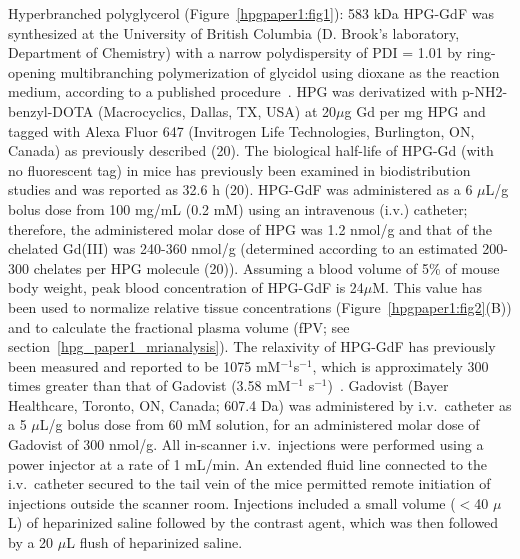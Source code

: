 Hyperbranched polyglycerol (Figure~\ref{hpgpaper1:fig1}): 583 \acs{kDa} \acs{HPG-GdF} was synthesized at the University of British Columbia (D. Brook's laboratory, Department of Chemistry) with a narrow polydispersity of PDI = 1.01 by ring-opening multibranching polymerization of glycidol using dioxane as the reaction medium, according to a published procedure~\cite{Kainthan:2006ce}.
HPG was derivatized with p-NH2-benzyl-DOTA (Macrocyclics, Dallas, TX, USA) at 20$\mu$g Gd per mg HPG and tagged with Alexa Fluor 647 (Invitrogen Life Technologies, Burlington, ON, Canada) as previously described (20).
The biological half-life of HPG-Gd (with no fluorescent tag) in mice has previously been examined in biodistribution studies and was reported as 32.6 h (20).
HPG-GdF was administered as a 6 $\mu$L/g bolus dose from 100 mg/mL (0.2 mM) using an intravenous (i.v.) catheter; therefore, the administered molar dose of HPG was 1.2 nmol/g and that of the chelated Gd(III) was 240-360 nmol/g (determined according to an estimated 200-300 chelates per HPG molecule (20)).
Assuming a blood volume of 5\% of mouse body weight, peak blood concentration of \acs{HPG-GdF} is 24$\mu$M.
This value has been used to normalize relative tissue concentrations (Figure~\ref{hpgpaper1:fig2}(B)) and to calculate the fractional plasma volume (\acs{fPV}; see section~\ref{hpg_paper1_mrianalysis}).
The relaxivity of \acs{HPG-GdF} has previously been measured and reported to be 1075 mM$^{-1}$s$^{-1}$, which is approximately 300 times greater than that of Gadovist (3.58 mM$^{-1}$ s$^{-1}$)~\cite{Saatchi:2012hc}.
Gadovist (Bayer Healthcare, Toronto, ON, Canada; 607.4 \acs{Da}) was administered by i.v.\ catheter as a 5 $\mu$L/g bolus dose from 60 mM solution, for an administered molar dose of Gadovist of 300 nmol/g.
All in-scanner i.v.\ injections were performed using a power injector at a rate of 1 mL/min.
An extended fluid line connected to the i.v.\ catheter secured to the tail vein of the mice permitted remote initiation of injections outside the scanner room.
Injections included a small volume ($<$40 $\mu$L) of heparinized saline followed by the contrast agent, which was then followed by a 20 $\mu$L flush of heparinized saline.

